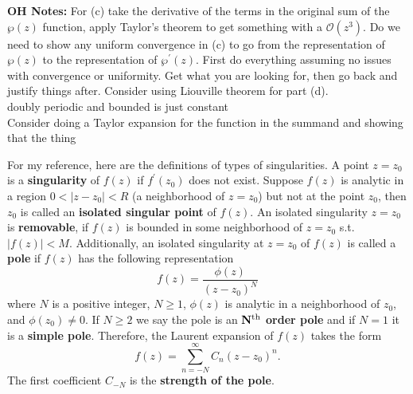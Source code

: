 \documentclass[10pt]{amsart}
\theoremstyle{nonumberplain}
\begin{document}
\begin{enumerate}[label={\bf {\arabic*}:}]
\begin{enumerate}
{\bf OH Notes: }
For (c) take the derivative of the terms in the original sum of the $\wp(z)$ function, apply Taylor's theorem to get something with a $\mathcal O(z^3)$.
Do we need to show any uniform convergence in (c) to go from the representation of $\wp(z)$ to the representation of $\wp^\prime(z)$.
First do everything assuming no issues with convergence or uniformity.
Get what you are looking for, then go back and justify things after.
Consider using Liouville theorem for part (d). \\

\noindent
doubly periodic and bounded is just constant \\

\noindent
Consider doing a Taylor expansion for the function in the summand and showing that the thing

\newpage
\noindent
For my reference, here are the definitions of types of singularities.
A point $z=z_0$ is a {\bf singularity} of $f(z)$ if $f^\prime(z_0)$ does not exist.
Suppose $f(z)$ is analytic in a region $0 < |z - z_0| < R$ (a neighborhood of $z = z_0$) but not at the point $z_0$, then $z_0$ is called an {\bf isolated singular point} of $f(z)$.
An isolated singularity $z=z_0$ is {\bf removable}, if $f(z)$ is bounded in some neighborhood of $z=z_0$ s.t. $|f(z)| < M$.
Additionally, an isolated singularity at $z = z_0$ of $f(z)$ is called a {\bf pole} if $f(z)$ has the following representation
$$
f(z) = \frac {\phi (z)}{(z - z_0)^N}
$$
where $N$ is a positive integer, $N \geq 1$, $\phi(z)$ is analytic in a neighborhood of $z_0$, and $\phi(z_0) \neq 0$.
If $N \geq 2$ we say the pole is an {\bf ${\bf N}^{\rm th}$ order pole} and if $N = 1$ it is a {\bf simple pole}.
Therefore, the Laurent expansion of $f(z)$ takes the form
$$
f(z) = \sum_{n=-N}^\infty C_n(z - z_0)^n.
$$
The first coefficient $C_{-N}$ is the {\bf strength of the pole}. 
\end{enumerate}
\end{enumerate}
\end{document}
